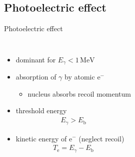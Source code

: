 \documentclass[11pt,xcolor=dvipsnames,professionalfonts,notes]{beamer}
\begin{document}
\subsection{Photoelectric effect}

\begin{frame}{Photoelectric effect}
	\begin{columns}
		\begin{itemize}
			\setlength\itemsep{1.5em}
			\item dominant for $E_\gamma < 1 \, \mathrm{MeV}$
			
			\item absorption of $\gamma$ by atomic $\mathrm{e}^-$
			\begin{itemize}
				\item nucleus absorbs recoil momentum
			\end{itemize}
			
			\item threshold energy
			\begin{align*}
				E_\gamma > E_\mathrm{b}
			\end{align*}

			\item kinetic energy of $\mathrm{e}^-$ (neglect recoil)
			\begin{align*}
				T_\mathrm{e} = E_\gamma - E_\mathrm{b}
			\end{align*}
		\end{itemize}
		

\end{columns}
\end{frame}
\end{document}
